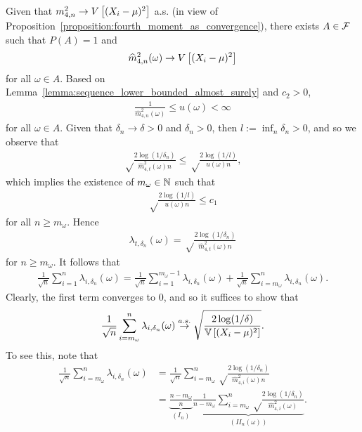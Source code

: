 Given that $m_{4, n}^2 \to V \left[ (X_i-\mu)^2\right]$ a.s. (in view of Proposition~\ref{proposition:fourth_moment_as_convergence}), there exists $A \in \mathcal{F}$ such that $P(A) = 1$ and %
    \begin{align*}
        \widehat m_{4, n}^2(\omega) \to V \left[ (X_i-\mu)^2\right] 
    \end{align*}
    for all $\omega \in A$. Based on Lemma~\ref{lemma:sequence_lower_bounded_almost_surely} and $c_2 > 0$, 
    \begin{align*}
        \frac{1}{\widehat m_{4, n}^2(\omega)} \leq u(\omega) < \infty
    \end{align*}
    for all $\omega \in A$. Given that $\delta_n \to \delta > 0$ and $\delta_n >0$, then $l := \inf_{n} \delta_n > 0$, and so we observe that
    \begin{align*}
        \sqrt\frac{2\log(1/\delta_n)}{\widehat m_{4, t}^2(\omega) n} \leq \sqrt\frac{2\log(1/l)}{u(\omega) n},
    \end{align*}
    which implies the existence of $m_\omega\in \mathbb{N}$ such that 
    \begin{align*}
        \sqrt\frac{2\log(1/l)}{u(\omega) n} \leq c_1
    \end{align*}
    for all $n \geq m_\omega$. Hence
    \begin{align*}
        \lambda_{t,\delta_n}(\omega) = \sqrt\frac{2\log(1/\delta_n)}{\widehat m_{4, t}^2(\omega) n}
    \end{align*}
    for $n \geq m_\omega$. It follows that
    \begin{align*}
        \frac{1}{\sqrt{n}} \sum_{i = 1}^n \lambda_{i,\delta_n}(\omega) = \frac{1}{\sqrt{n}} \sum_{i = 1}^{m_\omega - 1} \lambda_{i,\delta_n}(\omega) + \frac{1}{\sqrt{n}} \sum_{i = m_\omega}^n \lambda_{i,\delta_n}(\omega).
    \end{align*}
    Clearly, the first term converges to $0$, and so it suffices to show that
    \begin{align*}
        \frac{1}{\sqrt{n}} \sum_{i = m_\omega}^n \lambda_{i,\delta_n}(\omega) \stackrel{a.s.}{\to} \sqrt \frac{2 \log (1 / \delta)}{\mathbb{V} \left[ (X_i-\mu)^2\right]}.
    \end{align*}
    To see this, note that
    \begin{align*}
        \frac{1}{\sqrt{n}} \sum_{i = m_\omega}^n \lambda_{i,\delta_n}(\omega) &= \frac{1}{\sqrt{n}} \sum_{i = m_\omega}^n \sqrt\frac{2\log(1/\delta_n)}{\widehat m_{4, i}^2(\omega) n}
        \\&= \underbrace{\frac{n - m_\omega}{n}}_{(I_n)}\underbrace{ \frac{1}{n - m_\omega} \sum_{i = m_\omega}^n \sqrt\frac{2\log(1/\delta_n)}{\widehat m_{4, i}^2(\omega) }}_{(II_n(\omega))}.
    \end{align*}
